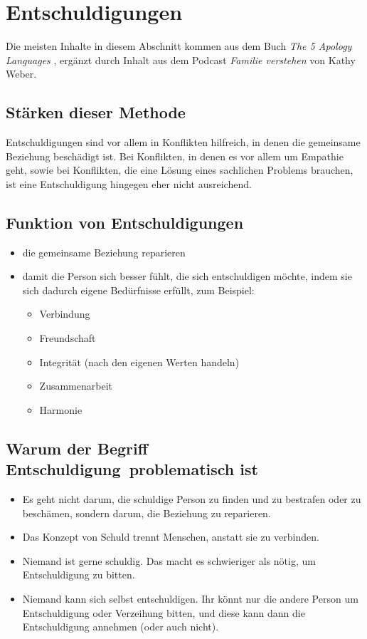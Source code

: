 \section{Entschuldigungen}
\label{entschuldigungen}

Die meisten Inhalte in diesem Abschnitt kommen aus dem Buch \emph{The 5 Apology Languages} \cite{apology-languages}, ergänzt durch Inhalt aus dem Podcast \emph{Familie verstehen} \cite{familie-verstehen-podcast} von Kathy Weber.


\subsection{Stärken dieser Methode}

Entschuldigungen sind vor allem in Konflikten hilfreich, in denen die gemeinsame Beziehung beschädigt ist. Bei Konflikten, in denen es vor allem um Empathie geht, sowie bei Konflikten, die eine Lösung eines sachlichen Problems brauchen, ist eine Entschuldigung hingegen eher nicht ausreichend.



\subsection{Funktion von Entschuldigungen}

\begin{itemize}
  \item die gemeinsame Beziehung reparieren
  \item damit die Person sich besser fühlt, die sich entschuldigen möchte, indem sie sich dadurch eigene Bedürfnisse erfüllt, zum Beispiel:
    \begin{itemize}
      \item Verbindung
      \item Freundschaft
      \item Integrität (nach den eigenen Werten handeln)
      \item Zusammenarbeit
      \item Harmonie
    \end{itemize}
\end{itemize}


\subsection{Warum der Begriff \glqq Entschuldigung\grqq\ problematisch ist}

\begin{itemize}
  \item Es geht nicht darum, die schuldige Person zu finden und zu bestrafen oder zu beschämen, sondern darum, die Beziehung zu reparieren.
  \item Das Konzept von Schuld trennt Menschen, anstatt sie zu verbinden.
  \item Niemand ist gerne schuldig. Das macht es schwieriger als nötig, um Entschuldigung zu bitten.
  \item Niemand kann sich selbst entschuldigen. Ihr könnt nur die andere Person um Entschuldigung oder Verzeihung bitten, und diese kann dann die Entschuldigung annehmen (oder auch nicht).
\end{itemize}


